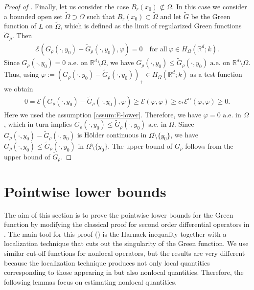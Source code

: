 \documentclass[reqno]{amsart}
\theoremstyle{plain}
\theoremstyle{definition}
\numberwithin{equation}{section}
\newcommand{\Rd}{\mathbb{R}^d}
\newcommand{\cl} {c_{\ast}}
\begin{document}
\begin{proof} [Proof of ]
Finally, let us consider the case $B_r(x_0) \not\subset \Omega$. In this case we 
consider a bounded open set $\tilde{\Omega} \supset \Omega$ such that $B_r(x_0) \subset \tilde{\Omega}$ and let $\tilde{G}$ be the Green function 
of $L$ on $\tilde{\Omega}$, which is defined as the limit of regularized Green functions $\tilde{G}_{\rho}$. Then 
\begin{align*}
\mathcal{E}\left(G_{\rho}(\cdot, y_0) - \tilde{G}_{\rho}(\cdot, y_0), \varphi \right) = 0 
\quad\text{for all} ~ \varphi \in H_{\Omega}(\Rd;k).
\end{align*}
Since $G_{\rho}(\cdot, y_0) = 0$ $\mathrm{a.e.}$ on $\Rd \setminus \Omega$, we have $G_{\rho}(\cdot, y_0) \leq \tilde{G}_{\rho}(\cdot, y_0)$ $\mathrm{a.e.}$ on $\Rd \setminus \Omega$. 
Thus, using $\varphi := (G_{\rho}(\cdot, y_0) - \tilde{G}_{\rho}(\cdot, y_0))_+ \in H_{\Omega}(\Rd; k)$ as a test function we obtain
\begin{align*}
0 
= \mathcal{E} \left( G_{\rho}(\cdot, y_0) - \tilde{G}_{\rho}(\cdot, y_0), \varphi \right) 
\geq \mathcal{E}(\varphi, \varphi) 
\geq \cl \mathcal{E}^{\alpha}(\varphi, \varphi) 
\geq 0.
\end{align*} 
Here we used the assumption \eqref{assum:E-lower}. Therefore, we have $\varphi = 0$ $\mathrm{a.e.}$ in 
$\Omega$, which in turn implies $G_{\rho}(\cdot, y_0) \leq \tilde{G}_{\rho}(\cdot, y_0)$ 
$\mathrm{a.e.}$ in $\Omega$. Since $G_{\rho}(\cdot, y_0) - \tilde{G}_{\rho}(\cdot, y_0)$ is H\"older 
continuous in $\Omega \setminus \lbrace y_0 \rbrace$, we have $G_{\rho}(\cdot, y_0) 
\leq \tilde{G}_{\rho}(\cdot, y_0)$ in $\Omega \setminus \lbrace y_0 \rbrace$. 
The upper bound of $G_{\rho}$ follows from the upper bound of $\tilde{G}_{\rho}$.
\end{proof}




\section{Pointwise lower bounds} \label{sec:lower-bounds}

The aim of this section is to prove the pointwise lower bounds for the Green function by modifying the classical proof for second order differential operators in \cite{GrWi82}. The main tool for this proof (\cite[Equation (1.9)]{GrWi82}) is the Harnack inequality together with a localization technique that cuts out the singularity of the Green function. We use similar cut-off functions for nonlocal operators, but the results are very different because the localization technique produces not only local quantities corresponding to those appearing in \cite{GrWi82} but also nonlocal quantities. Therefore, the following lemmas focus on estimating nonlocal quantities.
\end{document}
